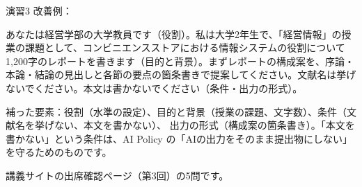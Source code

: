 \begin{answer}{演習3}
改善例：
\begin{promptbox}[改善後]
あなたは経営学部の大学教員です（役割）。私は大学2年生で、「経営情報」の授業の課題として、コンビニエンスストアにおける情報システムの役割について1,200字のレポートを書きます（目的と背景）。まずレポートの構成案を、序論・本論・結論の見出しと各節の要点の箇条書きで提案してください。文献名は挙げないでください。本文は書かないでください（条件・出力の形式）。
\end{promptbox}
補った要素：役割（水準の設定）、目的と背景（授業の課題、文字数）、条件（文献名を挙げない、本文を書かない）、
出力の形式（構成案の箇条書き）。「本文を書かない」という条件は、AI Policy の「AIの出力をそのまま提出物にしない」を守るためのものです。
\end{answer}

講義サイトの出席確認ページ（第3回）の5問です。

